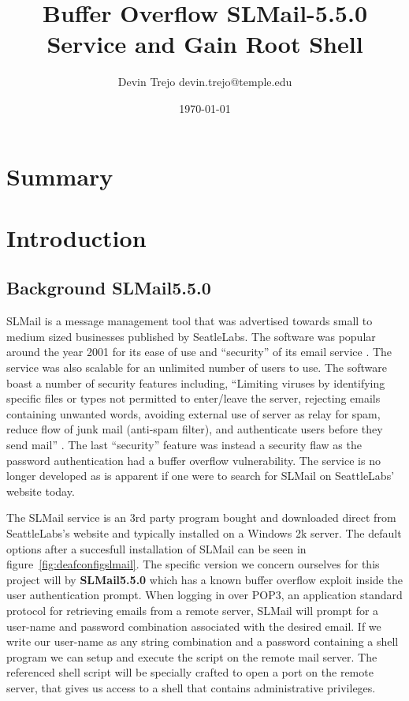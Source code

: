 \documentclass[12pt]{article}
\begin{document}
\title{Buffer Overflow SLMail-5.5.0 Service and Gain Root Shell}
\author{Devin Trejo \tabularnewline devin.trejo@temple.edu}
\date{\today}
\maketitle

\section{Summary}
\label{sect:summary}


\section{Introduction}
\label{sect:intro}
\subsection{Background SLMail5.5.0}
\label{sec:background}
SLMail is a message management tool that was advertised towards small to 
medium sized businesses published by SeatleLabs. The software was popular 
around the year 2001 for its ease of use and ``security'' of its email 
service \cite{SeattleLabs2001}. The service was also scalable for an 
unlimited number of users to use. The software boast a number of security 
features including, ``Limiting viruses by identifying specific files or types 
not permitted to enter/leave the server, rejecting emails containing unwanted 
words, avoiding external use of server as relay for spam, reduce flow of 
junk mail (anti-spam filter), and authenticate users before they send 
mail'' \cite{SeattleLabs2001}. The last ``security'' feature was instead a 
security flaw as the password authentication had a buffer overflow 
vulnerability. The service is no longer developed as is apparent if one
were to search for SLMail on SeattleLabs' website today. 

The SLMail service is an 3rd party program bought and downloaded direct
from SeattleLabs's website and typically installed on a Windows 2k server.
The default options after a succesfull installation of SLMail
can be seen in figure~\ref{fig:deafconfigslmail}. The specific version we 
concern ourselves for this project will by \textbf{SLMail5.5.0} which has a 
known buffer overflow exploit inside the user authentication prompt. When 
logging in over POP3, an application standard protocol for retrieving 
emails from a remote server, SLMail will prompt for a user-name and 
password combination associated with the desired email. If we write our 
user-name as any string combination and a password containing a shell program 
we can setup and execute the script on the remote mail server. The referenced 
shell script will be specially crafted to open a port on the remote server, 
that gives us access to a shell that contains administrative privileges. 
\end{document}
